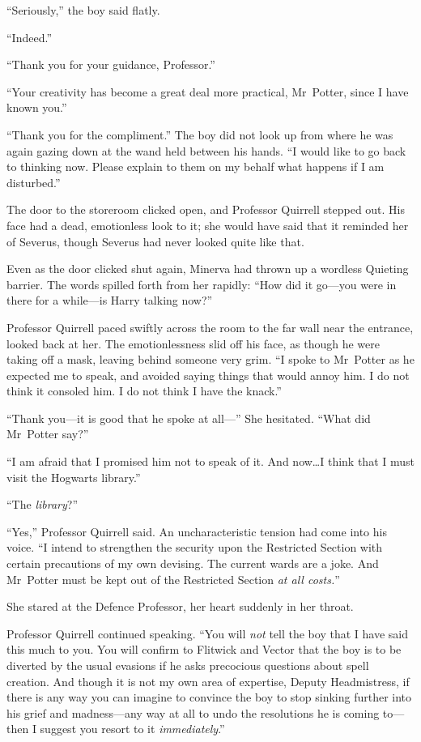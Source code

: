 “Seriously,” the boy said flatly.

“Indeed.”

“Thank you for your guidance, Professor.”

“Your creativity has become a great deal more practical, Mr~Potter, since I have known you.”

“Thank you for the compliment.” The boy did not look up from where he was again gazing down at the wand held between his hands. “I would like to go back to thinking now. Please explain to them on my behalf what happens if I am disturbed.”

\later

The door to the storeroom clicked open, and Professor Quirrell stepped out. His face had a dead, emotionless look to it; she would have said that it reminded her of Severus, though Severus had never looked quite like that.

Even as the door clicked shut again, Minerva had thrown up a wordless Quieting barrier. The words spilled forth from her rapidly: “How did it go—you were in there for a while—is Harry talking now?”

Professor Quirrell paced swiftly across the room to the far wall near the entrance, looked back at her. The emotionlessness slid off his face, as though he were taking off a mask, leaving behind someone very grim. “I spoke to Mr~Potter as he expected me to speak, and avoided saying things that would annoy him. I do not think it consoled him. I do not think I have the knack.”

“Thank you—it is good that he spoke at all—” She hesitated. “What did Mr~Potter say?”

“I am afraid that I promised him not to speak of it. And now…I think that I must visit the Hogwarts library.”

“The \emph{library}?”

“Yes,” Professor Quirrell said. An uncharacteristic tension had come into his voice. “I intend to strengthen the security upon the Restricted Section with certain precautions of my own devising. The current wards are a joke. And Mr~Potter must be kept out of the Restricted Section \emph{at all costs.}”

She stared at the Defence Professor, her heart suddenly in her throat.

Professor Quirrell continued speaking. “You will \emph{not} tell the boy that I have said this much to you. You will confirm to Flitwick and Vector that the boy is to be diverted by the usual evasions if he asks precocious questions about spell creation. And though it is not my own area of expertise, Deputy Headmistress, if there is any way you can imagine to convince the boy to stop sinking further into his grief and madness—any way at all to undo the resolutions he is coming to—then I suggest you resort to it \emph{immediately}.”
